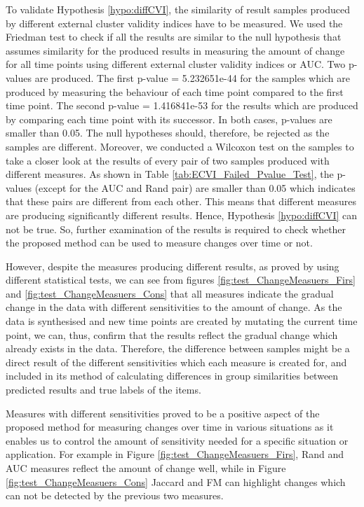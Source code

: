 To validate Hypothesis \ref{hypo:diffCVI}, the similarity of result samples produced by different external cluster validity indices have to be measured. We used the Friedman test to check if all the results are similar to the null hypothesis that assumes similarity for the produced results in measuring the amount of change for all time points using different external cluster validity indices or AUC. Two p-values are produced. The first p-value = 5.232651e-44 for the samples which are produced by measuring the behaviour of each time point compared to the first time point. The second p-value = 1.416841e-53 for the results which are produced by comparing each time point with its successor.  In both cases, p-values are smaller than 0.05.  The null hypotheses should, therefore, be rejected as the samples are different.  Moreover, we conducted a Wilcoxon test on the samples to take a closer look at the results of every pair of two samples produced with different measures. As shown in Table  \ref{tab:ECVI_Failed_Pvalue_Test}, the p-values (except for the AUC and Rand pair) are smaller than 0.05 which indicates that these pairs are different from each other. This means that different measures are producing significantly different results. Hence, Hypothesis \ref{hypo:diffCVI} can not be true. So, further examination of the results is required to check whether the proposed method can be used to measure changes over time or not.

However, despite the measures producing different results, as proved by using different statistical tests, we can see from figures \ref{fig:test_ChangeMeasuers_Firs} and \ref{fig:test_ChangeMeasuers_Cons} that all measures indicate the gradual change in the data with different sensitivities to the amount of change. As the data is synthesised and new time points are created by mutating the current time point, we can, thus, confirm that the results reflect the gradual change which already exists in the data. Therefore, the difference between samples might be a direct result of the different sensitivities which each measure is created for, and included in its method of calculating differences in group similarities between predicted results and true labels of the items.

Measures with different sensitivities proved to be a positive aspect of the proposed method for measuring changes over time in various situations as it enables us to control the amount of sensitivity needed for a specific situation or application. For example in Figure \ref{fig:test_ChangeMeasuers_Firs}, Rand and AUC measures reflect the amount of change well, while in Figure \ref{fig:test_ChangeMeasuers_Cons} Jaccard and FM can highlight changes which can not be detected by the previous two measures.



